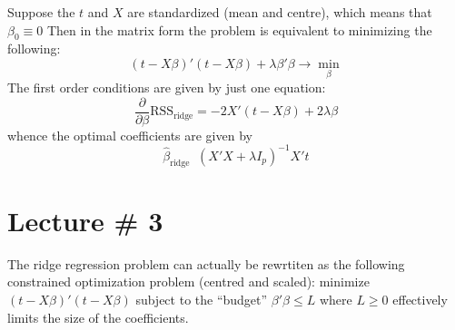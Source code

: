 \documentclass[a4paper]{article}
\newcommand{\RSS}{\text{RSS}}
\newcommand{\defn}{\mathop{\overset{\Delta}{=}}\nolimits}
\begin{document}
Suppose the $t$ and $X$ are standardized (mean and centre), which means that $\beta_0 \equiv 0$
Then in the matrix form the problem is equivalent to minimizing the following:
\[(t-X\beta)'(t-X\beta) + \lambda \beta'\beta \to \min_\beta\]
The first order conditions are given by just one equation:
\[\frac{\partial}{\partial \beta} \RSS_\text{ridge} = - 2 X'(t-X\beta) + 2 \lambda \beta\]
whence the optimal coefficients are given by
\[\hat{\beta}_\text{ridge} \defn (X'X + \lambda I_p)^{-1}X't\]




\clearpage
\section{Lecture \# 3} %
\label{sec:lecture_3}
The ridge regression problem can actually be rewrtiten as the following constrained
optimization problem (centred and scaled): minimize $(t-X\beta)'(t-X\beta)$ subject
to the ``budget'' $\beta'\beta\leq L$ where $L\geq0$ effectively limits the size
of the coefficients.
\end{document}
